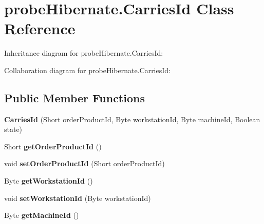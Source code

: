 \hypertarget{classprobe_hibernate_1_1_carries_id}{}\section{probe\+Hibernate.\+Carries\+Id Class Reference}
\label{classprobe_hibernate_1_1_carries_id}


Inheritance diagram for probe\+Hibernate.\+Carries\+Id\+:


Collaboration diagram for probe\+Hibernate.\+Carries\+Id\+:
\subsection*{Public Member Functions}
\begin{DoxyCompactItemize}
\item 
\mbox{\label{classprobe_hibernate_1_1_carries_id_a0dcbefe9d3d0d3262e87f0eb1629d048}} 
{\bfseries Carries\+Id} (Short order\+Product\+Id, Byte workstation\+Id, Byte machine\+Id, Boolean state)
\item 
\mbox{\label{classprobe_hibernate_1_1_carries_id_ac9ec7931f6d258186992429020745109}} 
Short {\bfseries get\+Order\+Product\+Id} ()
\item 
\mbox{\label{classprobe_hibernate_1_1_carries_id_a0538ca7877d47ae43f6acd0143cb4c48}} 
void {\bfseries set\+Order\+Product\+Id} (Short order\+Product\+Id)
\item 
\mbox{\label{classprobe_hibernate_1_1_carries_id_a16764fef5c6d6d347dcac3ee45ca2e3c}} 
Byte {\bfseries get\+Workstation\+Id} ()
\item 
\mbox{\label{classprobe_hibernate_1_1_carries_id_a1bd81d0a1130c5925af9fadeed09ce61}} 
void {\bfseries set\+Workstation\+Id} (Byte workstation\+Id)
\item 
\mbox{\label{classprobe_hibernate_1_1_carries_id_a096ebe6bc6d7f857cf3a4d0d39737653}} 
Byte {\bfseries get\+Machine\+Id} ()
\item 
\mbox{\label{classprobe_hibernate_1_1_carries_id_adfd6bc1d28f789ac1e042f4d4af60518}} 

\end{DoxyCompactItemize}
